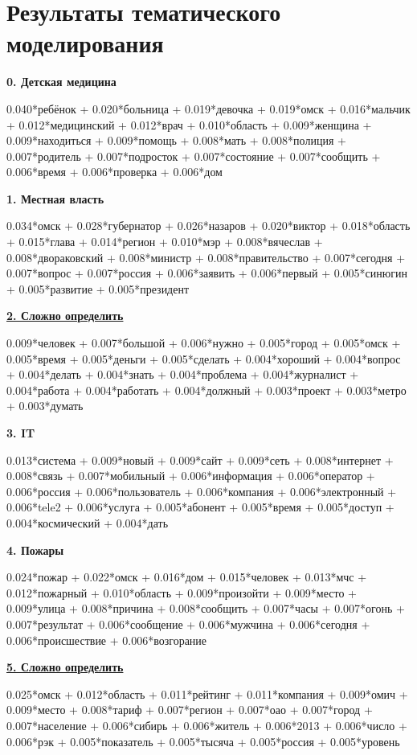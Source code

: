 \appendix
\chapter{Результаты тематического моделирования} \label{app:topics}
\textbf{0. Детская медицина}

0.040*ребёнок + 0.020*больница + 0.019*девочка + 0.019*омск + 0.016*мальчик + 0.012*медицинский + 0.012*врач + 0.010*область + 0.009*женщина + 0.009*находиться + 0.009*помощь + 0.008*мать + 0.008*полиция + 0.007*родитель + 0.007*подросток + 0.007*состояние + 0.007*сообщить + 0.006*время + 0.006*проверка + 0.006*дом

\textbf{1. Местная власть}

0.034*омск + 0.028*губернатор + 0.026*назаров + 0.020*виктор + 0.018*область + 0.015*глава + 0.014*регион + 0.010*мэр + 0.008*вячеслав + 0.008*двораковский + 0.008*министр + 0.008*правительство + 0.007*сегодня + 0.007*вопрос + 0.007*россия + 0.006*заявить + 0.006*первый + 0.005*синюгин + 0.005*развитие + 0.005*президент

\textbf{\underline{2. Сложно определить}}

0.009*человек + 0.007*большой + 0.006*нужно + 0.005*город + 0.005*омск + 0.005*время + 0.005*деньги + 0.005*сделать + 0.004*хороший + 0.004*вопрос + 0.004*делать + 0.004*знать + 0.004*проблема + 0.004*журналист + 0.004*работа + 0.004*работать + 0.004*должный + 0.003*проект + 0.003*метро + 0.003*думать

\textbf{3. IT}

0.013*система + 0.009*новый + 0.009*сайт + 0.009*сеть + 0.008*интернет + 0.008*связь + 0.007*мобильный + 0.006*информация + 0.006*оператор + 0.006*россия + 0.006*пользователь + 0.006*компания + 0.006*электронный + 0.006*tele2 + 0.006*услуга + 0.005*абонент + 0.005*время + 0.005*доступ + 0.004*космический + 0.004*дать

\textbf{4. Пожары}

0.024*пожар + 0.022*омск + 0.016*дом + 0.015*человек + 0.013*мчс + 0.012*пожарный + 0.010*область + 0.009*произойти + 0.009*место + 0.009*улица + 0.008*причина + 0.008*сообщить + 0.007*часы + 0.007*огонь + 0.007*результат + 0.006*сообщение + 0.006*мужчина + 0.006*сегодня + 0.006*происшествие + 0.006*возгорание

\textbf{\underline{5. Сложно определить}}

0.025*омск + 0.012*область + 0.011*рейтинг + 0.011*компания + 0.009*омич + 0.009*место + 0.008*тариф + 0.007*регион + 0.007*оао + 0.007*город + 0.007*население + 0.006*сибирь + 0.006*житель + 0.006*2013 + 0.006*число + 0.006*рэк + 0.005*показатель + 0.005*тысяча + 0.005*россия + 0.005*уровень

